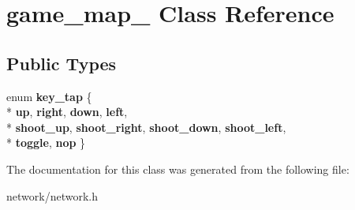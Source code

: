 \hypertarget{classgame__map__}{\section{game\+\_\+map\+\_\+ Class Reference}
\label{classgame__map__}
}
\subsection*{Public Types}
\begin{DoxyCompactItemize}
\item 
\hypertarget{classgame__map___a2615c91e1eb85eca32ca64671aae5518}{enum {\bfseries key\+\_\+tap} \{ \\*
{\bfseries up}, 
{\bfseries right}, 
{\bfseries down}, 
{\bfseries left}, 
\\*
{\bfseries shoot\+\_\+up}, 
{\bfseries shoot\+\_\+right}, 
{\bfseries shoot\+\_\+down}, 
{\bfseries shoot\+\_\+left}, 
\\*
{\bfseries toggle}, 
{\bfseries nop}
 \}}\label{classgame__map___a2615c91e1eb85eca32ca64671aae5518}

\end{DoxyCompactItemize}


The documentation for this class was generated from the following file\+:\begin{DoxyCompactItemize}
\item 
network/network.\+h\end{DoxyCompactItemize}

